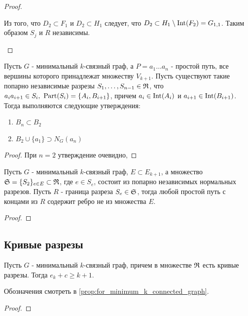 \begin{proof}
\begin{enumerate}
			Из того, что $D_2 \subset F_1$ и $D_2 \subset H_1$ следует, что $D_2 \subset H_1 \setminus \Int(F_2) = G_{1, 1}$.
			Таким образом $S_j$ и  $R$ независимы.
	\end{enumerate}


\end{proof}

\begin{lm}[Лемма 3.7] \label{lemma:3_7}
	Пусть $G$ - минимальный  $k$-связный граф, а  $P = a_1 \ldots a_n$ - простой путь, все вершины которого принадлежат множеству $V_{k + 1}$.
	Пусть существуют такие попарно независимые разрезы  $S_1, \ldots, S_{n - 1} \in \R$, что  $a_i a_{i + 1} \in S_i, \ \Part(S_i) = \{A_i, B_{i + 1}\}$, причем  $a_i \in \Int(A_i)$ и  $a_{i + 1} \in \Int(B_{i + 1})$.
	Тогда выполняются следующие утверждения:

	\begin{enumerate}
		\item $B_n \subset B_2$
		\item  $B_2 \cup \{a_1\} \supset N_G(a_n)$
	\end{enumerate}

\end{lm}

\begin{proof}
	При $n = 2$ утверждение очевидно, 
\end{proof}

\begin{lm}[Лемма 3.8] \label{lemma:3_8}
	Пусть $G$ - минимальный  $k$-связный граф,  $E \subset E_{k + 1}$, а множество  $\S = \{S_2\}_{e \in E} \subset \R$, где  $e \in S_e$, состоит из попарно независимых нормальных разрезов.
	Пусть  $R$ - граница разреза  $S_e \in \S$, тогда любой простой путь с концами из  $R$ содержит ребро не из множества  $E$.
\end{lm}

\begin{proof}
\end{proof}

\subsection{Кривые разрезы}

\begin{lm}[Лемма 3.9] \label{lemma:3_9}
	Пусть $G$ - минимальный  $k$-связный граф, причем в множестве  $\R$ есть кривые разрезы.
	Тогда  $e_k + c \geqslant k + 1$.
\end{lm}

Обозначения смотреть в \ref{prop:for_minimum_k_connected_graph}.

\begin{proof}
\end{proof}


